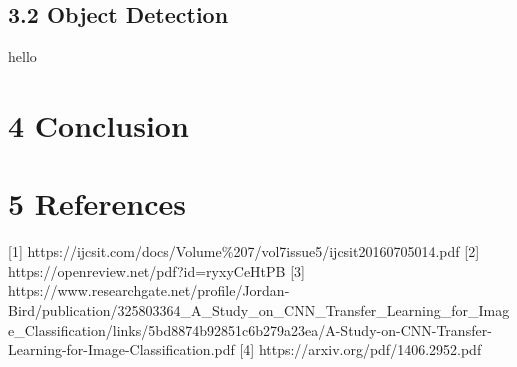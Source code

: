 \documentclass[12pt]{article}
\begin{document}
\subsection*{3.2 \hspace{10pt} Object Detection}
hello



\section*{\large{4 \hspace{10pt} Conclusion}}

\section*{\large{5 \hspace{10pt} References}}
[1] https://ijcsit.com/docs/Volume\%207/vol7issue5/ijcsit20160705014.pdf
[2] https://openreview.net/pdf?id=ryxyCeHtPB
[3] https://www.researchgate.net/profile/Jordan-Bird/publication/325803364\_A\_Study\_on\_CNN\_Transfer\_Learning\_for\_Image\_Classification/links/5bd8874b92851c6b279a23ea/A-Study-on-CNN-Transfer-Learning-for-Image-Classification.pdf
[4] https://arxiv.org/pdf/1406.2952.pdf
\end{document}
